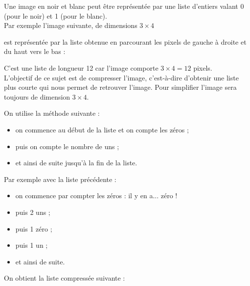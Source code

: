 
\maketitle


Une image en noir et blanc peut être représentée par une liste d'entiers valant 0 (pour le noir) et 1 (pour le blanc).\\
Par exemple l'image suivante, de dimensions $3\times 4$ 
\begin{center}
\end{center}

est représentée par la liste obtenue en parcourant les pixels de gauche à droite et du haut vers le bas :


C'est une liste de longueur 12 car l'image comporte $3\times 4 = 12$ pixels.\\


L'objectif de ce sujet est de compresser l'image, c'est-à-dire d'obtenir une liste plus courte qui nous permet de retrouver l'image. Pour simplifier l'image sera toujours de dimension $3\times 4$.

On utilise la méthode suivante :
\begin{itemize}
	\item on commence au début de la liste et on compte les zéros ;
    \item puis on compte le nombre de uns ;
    \item et ainsi de suite jusqu'à la fin de la liste.
\end{itemize}
Par exemple avec la liste précédente :
\begin{itemize}
	\item on commence par compter les zéros : il y en a... zéro !
    \item puis 2 uns ;
    \item puis 1 zéro ;
    \item puis 1 un ;
    \item et ainsi de suite.
\end{itemize}
On obtient la liste compressée suivante :

